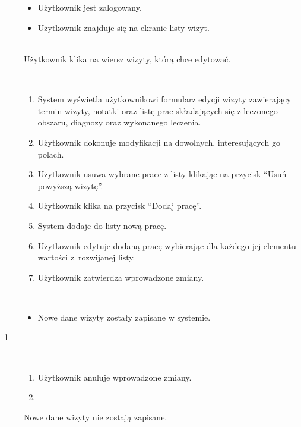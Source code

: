 \documentclass[11pt]{aghdpl}
\begin{document}
	\begin{description}
		\item[\useCaseAktor] \hfill \\
			\useCaseUzytkownik
		\item[\useCaseWarPocz] \hfill \\
			\begin{itemize}
				\item Użytkownik jest zalogowany.
				\item Użytkownik znajduje się na ekranie listy wizyt.
			\end{itemize}
		\item[\useCaseZdarzInicj] \hfill \\
			Użytkownik klika na wiersz wizyty, którą chce edytować.
		\item[\useCaseScenBaz] \hfill \\ 
			\begin{enumerate}
				\item System wyświetla użytkownikowi formularz edycji wizyty zawierający termin wizyty, notatki oraz listę prac składających się z leczonego obszaru, diagnozy oraz wykonanego leczenia.
				\item Użytkownik dokonuje modyfikacji na dowolnych, interesujących go polach.
				\item Użytkownik usuwa wybrane prace z listy klikając na przycisk ``Usuń powyższą wizytę''.
				\item Użytkownik klika na przycisk ``Dodaj pracę''.
				\item System dodaje do listy nową pracę.
				\item Użytkownik edytuje dodaną pracę wybierając dla każdego jej elementu wartości z~rozwijanej listy.
				\item Użytkownik zatwierdza wprowadzone zmiany.
			\end{enumerate}
		\item[\useCaseWarKonc] \hfill \\ 
			\begin{itemize}
				\item Nowe dane wizyty zostały zapisane w systemie.
			\end{itemize}
			
		\item[\useCaseWyjatek~1] \hfill \\
			\begin{enumerate}[label=7a\arabic*.]
				\item Użytkownik anuluje wprowadzone zmiany.
				\item \useCaseEnd
			\end{enumerate}
			Nowe dane wizyty nie zostają zapisane.
	\end{description}
\end{document}
